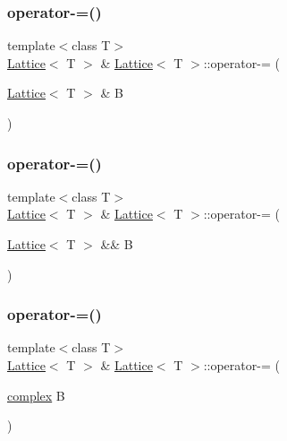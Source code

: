 \mbox{\label{class_lattice_abc6ee1293f4490f34f96b85233b03ed1}} 
\subsubsection{\texorpdfstring{operator-\/=()}{operator-=()}\hspace{0.1cm}{\footnotesize\ttfamily [1/3]}}
{\footnotesize\ttfamily template$<$class T$>$ \\
\mbox{\hyperlink{class_lattice}{Lattice}}$<$ T $>$ \& \mbox{\hyperlink{class_lattice}{Lattice}}$<$ T $>$\+::operator-\/= (\begin{DoxyParamCaption}\item[{\mbox{\hyperlink{class_lattice}{Lattice}}$<$ T $>$ \&}]{B }\end{DoxyParamCaption})\hspace{0.3cm}{\ttfamily [inline]}}

\mbox{\label{class_lattice_a814b798e40210ac2aed7cbd876625c30}} 
\subsubsection{\texorpdfstring{operator-\/=()}{operator-=()}\hspace{0.1cm}{\footnotesize\ttfamily [2/3]}}
{\footnotesize\ttfamily template$<$class T$>$ \\
\mbox{\hyperlink{class_lattice}{Lattice}}$<$ T $>$ \& \mbox{\hyperlink{class_lattice}{Lattice}}$<$ T $>$\+::operator-\/= (\begin{DoxyParamCaption}\item[{\mbox{\hyperlink{class_lattice}{Lattice}}$<$ T $>$ \&\&}]{B }\end{DoxyParamCaption})\hspace{0.3cm}{\ttfamily [inline]}}

\mbox{\label{class_lattice_a848d049b47fe69fc99fd54d8a39b544f}} 
\subsubsection{\texorpdfstring{operator-\/=()}{operator-=()}\hspace{0.1cm}{\footnotesize\ttfamily [3/3]}}
{\footnotesize\ttfamily template$<$class T$>$ \\
\mbox{\hyperlink{class_lattice}{Lattice}}$<$ T $>$ \& \mbox{\hyperlink{class_lattice}{Lattice}}$<$ T $>$\+::operator-\/= (\begin{DoxyParamCaption}\item[{\mbox{\hyperlink{classcomplex}{complex}}}]{B }\end{DoxyParamCaption})\hspace{0.3cm}{\ttfamily [inline]}}

